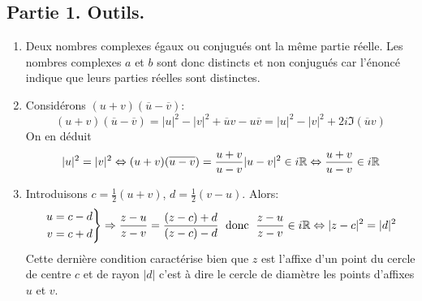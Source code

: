\subsection*{Partie 1. Outils.}
\begin{enumerate}
  \item Deux nombres complexes égaux ou conjugués ont la même partie réelle. Les nombres complexes $a$ et $b$ sont donc distincts et non conjugués car l'énoncé indique que leurs parties réelles sont distinctes. 
  \item Considérons $(u+v)(\overline{u}-\overline{v})$:
\begin{displaymath}
(u+v)(\overline{u}-\overline{v}) = |u|^2-|v|^2 +\overline{u}v-u\overline{v}
= |u|^2-|v|^2 +2i\Im(\overline{u}v)
\end{displaymath}
On en déduit 
\begin{displaymath}
|u|^2=|v|^2\Leftrightarrow  (u+v)(\overline{u-v})=\frac{u+v}{u-v}|u-v|^2\in i\mathbb{R}
\Leftrightarrow  \frac{u+v}{u-v} \in i\mathbb{R}
\end{displaymath}
  
  \item Introduisons $c=\frac{1}{2}(u+v)$, $d=\frac{1}{2}(v-u)$. Alors:
\begin{displaymath}
\left. 
\begin{aligned}
u &= c-d \\ v &= c+d   
\end{aligned}
\right\rbrace \Rightarrow
\frac{z-u}{z-v} = \frac{(z-c)+d}{(z-c)-d}
\;\text{ donc }\;
\frac{z-u}{z-v}\in i\mathbb{R} \Leftrightarrow |z-c|^2 = |d|^2
\end{displaymath}
Cette dernière condition caractérise bien que $z$ est l'affixe d'un point du cercle de centre $c$ et de rayon $|d|$ c'est à dire le cercle de diamètre les points d'affixes $u$ et $v$.
\end{enumerate}

